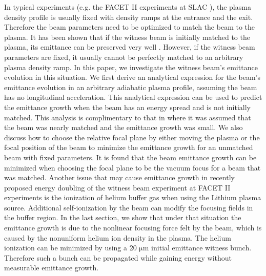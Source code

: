\documentclass[%
reprint, superscriptaddress,
 amsmath,amssymb, aps,
prstab,
]{revtex4-2}
\begin{document}
In typical experiments (e.g. the FACET II experiments at
SLAC \cite{PWFA_FACETII}), the plasma density profile is usually fixed
with density ramps at the entrance and the exit. Therefore the beam parameters need to be optimized to match the beam to the plasma. It has been shown
that if the witness beam is initially matched to the plasma, its
emittance can be preserved very well \cite{PWFA_FACETII}. However, if
the witness beam parameters are fixed, it usually cannot be perfectly matched to an arbitrary plasma density ramp. In this paper, we investigate the witness
beam's emittance evolution in this situation. We first derive an
analytical expression for the beam's emittance evolution in an arbitrary
adiabatic plasma profile, assuming the beam has no longitudinal
acceleration. This analytical expression can be used to predict the
emittance growth when the beam has an energy spread and is not initially matched. This analysis is complimentary to that in \cite{Robert} where it was assumed that the beam was nearly matched and the emittance growth was small. 
We also discuss how to choose the relative focal plane by either moving the plasma or the focal position of the beam to minimize the emittance growth for an
unmatched beam with fixed parameters. It is found that the beam emittance growth can be minimized
when choosing the focal plane to be the vacuum focus for a beam that was matched.
Another issue that may cause emittance growth in recently proposed energy doubling of the witness beam experiment at FACET II experiments \cite{PWFA2007} is the
ionization of helium buffer gas when using the Lithium plasma source. Additional self-ionization \cite{Bruhwiler} by the beam can modify the focusing fields in the buffer region. In the last section, we show that
under that situation the emittance growth is due to the nonlinear
focusing force felt by the beam, which is caused by the nonuniform
helium ion density in the plasma. 
The helium ionization can be minimized by using a 20 $\mathrm{\mu m}$ initial emittance witness bunch. Therefore such a bunch can be propagated while gaining energy without measurable emittance growth.
\end{document}
